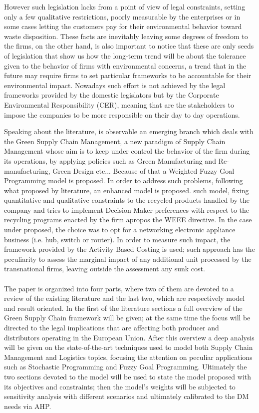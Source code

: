 \begin{doublespace}
  However such legislation lacks from a point of view of legal constraints, setting only a few qualitative restrictions, poorly measurable by the enterprises or in some cases letting the customers pay for their environmental behavior toward waste disposition. These facts are inevitably leaving some degrees of freedom to the firms, on the other hand, is also important to notice that these are only seeds of legislation that show us how the long-term trend will be about the tolerance given to the behavior of firms with environmental concerns, a trend that in the future may require firms to set particular frameworks to be accountable for their environmental impact. Nowadays such effort is not achieved by the legal frameworks provided by the domestic legislators but by the Corporate Environmental Responsibility (CER), meaning that are the stakeholders to impose the companies to be more responsible on their day to day operations.

Speaking about the literature, is observable an emerging branch which deals with the Green Supply Chain Management, a new paradigm of Supply Chain Management whose aim is to keep under control the behavior of the firm during its operations, by applying policies such as Green Manufacturing and Re-manufacturing, Green Design etc... Because of that a Weighted Fuzzy Goal Programming model is proposed. In order to address such problems, following what proposed by literature, an enhanced model is proposed. such model, fixing quantitative and qualitative constraints to the recycled products handled by the company and tries to implement Decision Maker preferences  with respect to the recycling programs enacted by the firm apropos the WEEE directive. In the case under proposed, the choice was to opt for a networking electronic appliance business (i.e. hub, switch or router).  In order to measure such impact, the framework provided by the Activity Based Costing is used; such approach has the peculiarity to assess the marginal impact of any additional unit processed by the transnational firms, leaving outside the assessment any sunk cost.
\\
\\
The paper is organized into four parts, where two of them are devoted to a review of the existing literature and the last two, which are respectively model and result oriented. In the first of the literature sections a full overview of the Green Supply Chain framework will be given; at the same time the focus will be directed to the legal implications that are affecting both producer and distributors operating in the European Union. After this overview a deep analysis will be given on the state-of-the-art techniques used to model both Supply Chain Management and Logistics topics, focusing the attention on peculiar applications such as Stochastic Programming and Fuzzy Goal Programming. Ultimately the two sections devoted to the model will be used to state the model proposed with its objectives and constraints; then the model's weights will be subjected to sensitivity analysis with different scenarios and ultimately calibrated to the DM needs via AHP.


\end{doublespace}

